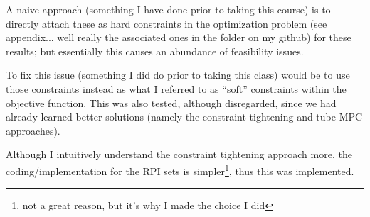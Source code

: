 \documentclass[]{IEEEtran}
\begin{document}
A naive approach (something I have done prior to taking this course) is to directly attach these as hard constraints in the optimization problem (see appendix... well really the associated ones in the folder on my github) for these results; but essentially this causes an abundance of feasibility issues.

To fix this issue (something I did do prior to taking this class) would be to use those constraints instead as what I referred to as ``soft'' constraints within the objective function.
This was also tested, although disregarded, since we had already learned better solutions (namely the constraint tightening and tube MPC approaches).

Although I intuitively understand the constraint tightening approach more, the coding/implementation for the RPI sets is simpler\footnote{not a great reason, but it's why I made the choice I did}, thus this was implemented.
\end{document}
